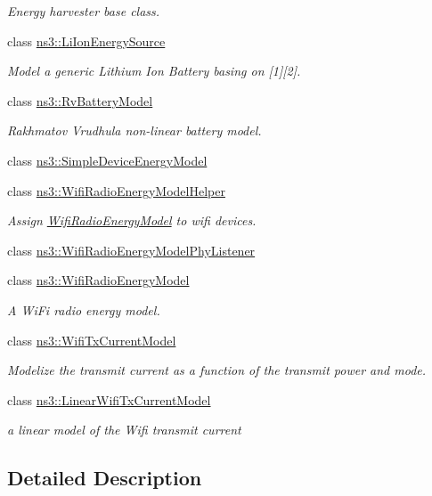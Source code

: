 \begin{DoxyCompactItemize}
\begin{DoxyCompactList}\small\item\em Energy harvester base class. \end{DoxyCompactList}\item 
class \hyperlink{classns3_1_1LiIonEnergySource}{ns3\+::\+Li\+Ion\+Energy\+Source}
\begin{DoxyCompactList}\small\item\em Model a generic Lithium Ion Battery basing on \mbox{[}1\mbox{]}\mbox{[}2\mbox{]}. \end{DoxyCompactList}\item 
class \hyperlink{classns3_1_1RvBatteryModel}{ns3\+::\+Rv\+Battery\+Model}
\begin{DoxyCompactList}\small\item\em Rakhmatov Vrudhula non-\/linear battery model. \end{DoxyCompactList}\item 
class \hyperlink{classns3_1_1SimpleDeviceEnergyModel}{ns3\+::\+Simple\+Device\+Energy\+Model}
\item 
class \hyperlink{classns3_1_1WifiRadioEnergyModelHelper}{ns3\+::\+Wifi\+Radio\+Energy\+Model\+Helper}
\begin{DoxyCompactList}\small\item\em Assign \hyperlink{classns3_1_1WifiRadioEnergyModel}{Wifi\+Radio\+Energy\+Model} to wifi devices. \end{DoxyCompactList}\item 
class \hyperlink{classns3_1_1WifiRadioEnergyModelPhyListener}{ns3\+::\+Wifi\+Radio\+Energy\+Model\+Phy\+Listener}
\item 
class \hyperlink{classns3_1_1WifiRadioEnergyModel}{ns3\+::\+Wifi\+Radio\+Energy\+Model}
\begin{DoxyCompactList}\small\item\em A Wi\+Fi radio energy model. \end{DoxyCompactList}\item 
class \hyperlink{classns3_1_1WifiTxCurrentModel}{ns3\+::\+Wifi\+Tx\+Current\+Model}
\begin{DoxyCompactList}\small\item\em Modelize the transmit current as a function of the transmit power and mode. \end{DoxyCompactList}\item 
class \hyperlink{classns3_1_1LinearWifiTxCurrentModel}{ns3\+::\+Linear\+Wifi\+Tx\+Current\+Model}
\begin{DoxyCompactList}\small\item\em a linear model of the Wifi transmit current \end{DoxyCompactList}\end{DoxyCompactItemize}


\subsection{Detailed Description}
